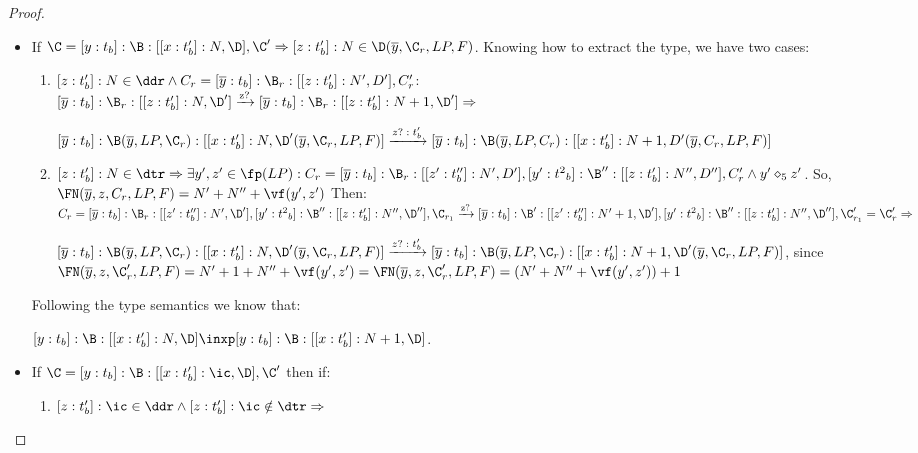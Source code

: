 \begin{proof}
\begin{itemize}
\item If $\C=[y:t_b]:\B:[[x:t_b']:N,\D],\C' \Rightarrow   [z:t_b']:N \in \D(\overline{y},\C_r,LP,F)$. Knowing how to extract the type, we have two cases:


\begin{enumerate}
\item $[z:t_b']:N\in \ddr \wedge C_r=[\overline{y}:t_b]:\B_r:[[z:t_b']:N',D'],C_r'  $: \\ 

$[\overline{y}:t_b]:\B_r:[[z:t_b']:N,\D']\xrightarrow{\text{z?}} [\overline{y}:t_b]:\B_r:[[z:t_b']:N+1,\D'] \Rightarrow$

$[\overline{y}:t_b]:\B(\overline{y},LP,\C_r):[[x:t_b']:N,\D'(\overline{y},\C_r,LP,F)] \xrightarrow{\text{$z?:t_b'$}}[\overline{y}:t_b]:\B(\overline{y},LP,C_r):[[x:t_b']:N+1,D'(\overline{y},C_r,LP,F)]$\\

\item $ [z:t_b']:N \in \dtr \Rightarrow \exists y',z'\in \fp(LP): C_r=[\overline{y}:t_b]:\B_r:[[z':t_b'']:N',D'],[y':{t^2}_b]:\B'':[[z:t_b']:N'',D''],C_r' \wedge y'\diamond_5 z'$. So, $\FN(\overline{y},z,C_r,LP,F)=N'+N''+\vf(y',z')$ Then:\\

$C_r=[\overline{y}:t_b]:\B_r:[[z':t_b'']:N',\D'],[y':{t^2}_b]:\B'':[[z:t_b']:N'',\D''],\C_{r_1}\xrightarrow{\text{z?}}[\overline{y}:t_b]:\B':[[z':t_b'']:N'+1,\D'],[y':{t^2}_b]:\B'':[[z:t_b']:N'',\D''],\C_{r_1}'= \C_r' \Rightarrow$

$[\overline{y}:t_b]:\B(\overline{y},LP,\C_r):[[x:t_b']:N,\D'(\overline{y},\C_r,LP,F)] \xrightarrow{\text{$z?:t_b'$}}[\overline{y}:t_b]:\B(\overline{y},LP,\C_r):[[x:t_b']:N+1,\D'(\overline{y},\C_r,LP,F)]$, since $\FN(\overline{y},z,\C_r',LP,F)=N'+1+N''+\vf(y',z')=\FN(\overline{y},z,\C_r',LP,F)=(N'+N''+\vf(y',z'))+1$






\end{enumerate}

Following the type semantics we know that:

$[y:t_b]:\B:[[x:t_b']:N,\D]\inxp [y:t_b]:\B:[[x:t_b']:N+1,\D]$.\\


\item If $\C=[y:t_b]:\B:[[x:t_b']:\ic,\D],\C'$ then if:

\begin{enumerate}

\item $[z:t_b']:\ic \in \ddr \wedge [z:t_b']:\ic \notin \dtr\Rightarrow$


\end{enumerate}
\end{itemize}
\end{proof}
